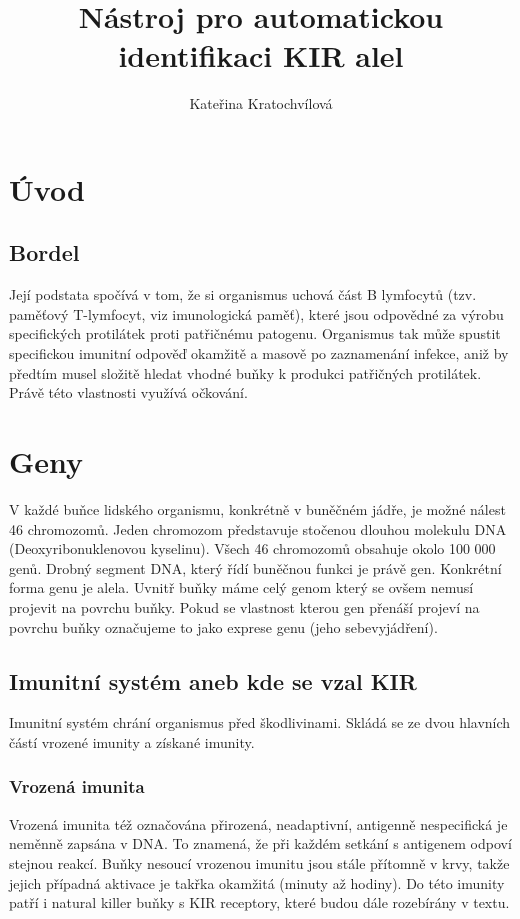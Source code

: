 \documentclass[czech,DP]{thesiskiv}
\author{Kateřina Kratochvílová}
\title{Nástroj pro automatickou identifikaci KIR alel}
\begin{document}
%
\maketitle
\tableofcontents

\chapter{Úvod}



\section{Bordel}
Její podstata spočívá v tom, že si organismus uchová část B lymfocytů (tzv. paměťový T-lymfocyt, viz imunologická paměť), které jsou odpovědné za výrobu specifických protilátek proti patřičnému patogenu. Organismus tak může spustit specifickou imunitní odpověď okamžitě a masově po zaznamenání infekce, aniž by předtím musel složitě hledat vhodné buňky k produkci patřičných protilátek. Právě této vlastnosti využívá očkování.



\chapter{Geny}
V každé buňce lidského organismu, konkrétně v buněčném jádře, je možné nálest 46 chromozomů. Jeden chromozom představuje stočenou dlouhou molekulu DNA (Deoxyribonuklenovou kyselinu). Všech 46 chromozomů obsahuje okolo 100 000 genů. Drobný segment DNA, který řídí buněčnou funkci je právě gen. Konkrétní forma genu je alela. \citep{en_smith} Uvnitř buňky máme celý genom který se ovšem nemusí projevit na povrchu buňky. Pokud se vlastnost kterou gen přenáší projeví na povrchu buňky označujeme to jako exprese genu (jeho sebevyjádření).


\section{Imunitní systém aneb kde se vzal KIR}
Imunitní systém chrání organismus před škodlivinami. Skládá se ze dvou hlavních částí vrozené imunity a získané imunity. 

\subsection{Vrozená imunita}
Vrozená imunita též označována přirozená, neadaptivní, antigenně nespecifická je neměnně zapsána v DNA. To znamená, že při každém setkání s antigenem odpoví stejnou reakcí. Buňky nesoucí vrozenou imunitu jsou stále přítomně v krvy, takže jejich případná aktivace je takřka okamžitá (minuty až hodiny). Do této imunity patří i natural killer buňky s KIR receptory, které budou dále rozebírány v textu. 
\end{document}
